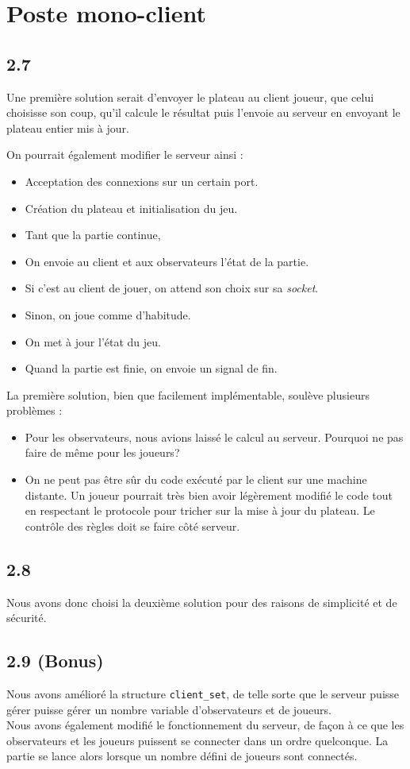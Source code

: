 \documentclass[12pt]{article}
\def\question#1{\subsection{#1}}
\def\sec#1{\section{#1}}
\begin{document}
\sec{Poste mono-client}
\question{2.7}
Une première solution serait d'envoyer le plateau au client joueur, que celui choisisse son coup, qu'il calcule le résultat puis l'envoie au serveur en envoyant le plateau entier mis à jour.


On pourrait également modifier le serveur ainsi :
\begin{itemize}
  \item Acceptation des connexions sur un certain port.
  \item Création du plateau et initialisation du jeu.
  \item Tant que la partie continue,
  \item On envoie au client et aux observateurs l'état de la partie.
  \item Si c'est au client de jouer, on attend son choix sur sa \textit{socket}.
  \item Sinon, on joue comme d'habitude.
  \item On met à jour l'état du jeu.
  \item Quand la partie est finie, on envoie un signal de fin.
\end{itemize}


La première solution, bien que facilement implémentable, soulève plusieurs problèmes :
\begin{itemize}
\item Pour les observateurs, nous avions laissé le calcul au serveur. Pourquoi ne pas faire de même pour les joueurs?
\item On ne peut pas être sûr du code exécuté par le client sur une machine distante. Un joueur pourrait très bien avoir légèrement modifié le code tout en respectant le protocole pour tricher sur la mise à jour du plateau. Le contrôle des règles doit se faire côté serveur.
\end{itemize}



\question{2.8}
Nous avons donc choisi la deuxième solution pour des raisons de simplicité et de sécurité.

\question{2.9 (Bonus)}
Nous avons amélioré la structure \texttt{client\_set}, de telle sorte que le serveur puisse gérer puisse gérer un nombre variable d'observateurs et de joueurs. \\
Nous avons également modifié le fonctionnement du serveur, de façon à ce que les observateurs et les joueurs puissent se connecter dans un ordre quelconque. La partie se lance alors lorsque un nombre défini de joueurs sont connectés.
\end{document}
